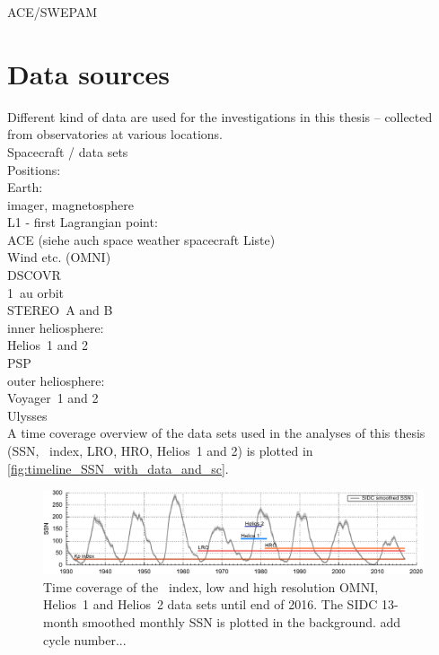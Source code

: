 ACE/SWEPAM\\	%

\section{Data sources}

Different kind of data are used for the investigations in this thesis -- collected from observatories at various locations.\\

Spacecraft / data sets\\

Positions:\\
Earth:\\
	imager, magnetosphere\\
L1 - first Lagrangian point:\\
	ACE (siehe auch space weather spacecraft Liste)\\
	Wind etc. (OMNI)\\
	DSCOVR\\
1~au orbit\\
	STEREO~A and B\\
inner heliosphere:\\
	Helios~1 and 2\\
	PSP\\
outer heliosphere:\\
	Voyager~1 and 2\\
	Ulysses\\

A time coverage overview of the data sets used in the analyses of this thesis (SSN, \Kp~index, LRO, HRO, Helios~1 and 2) is plotted in \autoref{fig:timeline_SSN_with_data_and_sc}.\\
\begin{figure}[htb]
	\centering
	\includegraphics[width=\textwidth]{images/gnuplots/timeline_SSN_with_data_and_sc.pdf}
	\caption{Time coverage of the \Kp~index, low and high resolution OMNI, Helios~1 and Helios~2 data sets until end of 2016. The SIDC 13-month smoothed monthly SSN is plotted in the background. add cycle number...}
	\label{fig:timeline_SSN_with_data_and_sc}
\end{figure}



